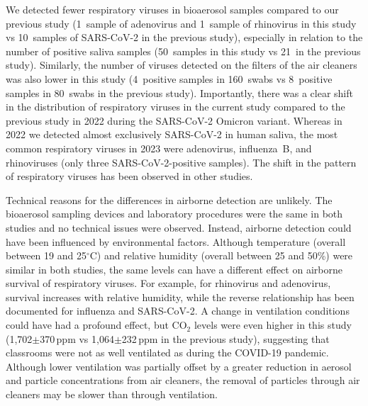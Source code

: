 \documentclass[fleqn,11pt]{wlscirep}
\begin{document}

We detected fewer respiratory viruses in bioaerosol samples compared to our previous study\cite{Banholzer2023PLoSMed} (1~sample of adenovirus and 1~sample of rhinovirus in this study vs 10~samples of SARS-CoV-2 in the previous study), especially in relation to the number of positive saliva samples (50~samples in this study vs 21~in the previous study). Similarly, the number of viruses detected on the filters of the air cleaners was also lower in this study (4~positive samples in 160~swabs vs 8~positive samples in 80~swabs in the previous study). Importantly, there was a clear shift in the distribution of respiratory viruses in the current study compared to the previous study in 2022 during the SARS-CoV-2 Omicron variant. Whereas in 2022 we detected almost exclusively SARS-CoV-2 in human saliva, the most common respiratory viruses in 2023 were adenovirus, influenza~B, and rhinoviruses (only three SARS-CoV-2-positive samples). The shift in the pattern of respiratory viruses has been observed in other studies\cite{Nygaard2023Lancet,Sauteur2022EuroSurv}. 


Technical reasons for the differences in airborne detection are unlikely. The bioaerosol sampling devices and laboratory procedures were the same in both studies and no technical issues were observed. Instead, airborne detection could have been influenced by environmental factors. Although temperature (overall between 19 and 25$^{\circ}$C) and relative humidity (overall between 25 and 50\%) were similar in both studies, the same levels can have a different effect on airborne survival of respiratory viruses. For example, for rhinovirus and adenovirus, survival increases with relative humidity, while the reverse relationship has been documented for influenza and SARS-CoV-2\cite{Tellier2009JTRSI,Ahlawat2020AAQR,Biryukov2020mS,Karim1985CJM,Davis1971AM}. A change in ventilation conditions could have had a profound effect, but CO$_2$ levels were even higher in this study (1,702$\pm$370\,ppm vs 1,064$\pm$232\,ppm in the previous study), suggesting that classrooms were not as well ventilated as during the COVID-19 pandemic. Although lower ventilation was partially offset by a greater reduction in aerosol and particle concentrations from air cleaners, the removal of particles through air cleaners may be slower than through ventilation.

\end{document}
